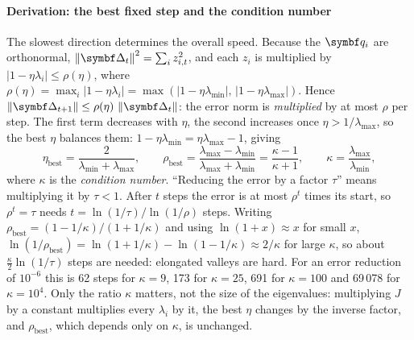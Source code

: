 \documentclass[11pt]{article}
\newcommand{\errv}{\vect{\Delta}}
\newcommand{\qvec}{\vect{q}}
\begin{document}
\paragraph{Derivation: the best fixed step and the condition number} The slowest direction determines the overall
speed. Because the $\qvec_i$ are orthonormal, $\norm{\errv_t}^2 = \sum_i z_{i,t}^2$, and each $z_i$ is multiplied by
$|1 - \eta\lambda_i| \le \rho(\eta)$, where
$\rho(\eta) = \max_i |1 - \eta\lambda_i| = \max(|1 - \eta\lambda_{\min}|,\, |1 - \eta\lambda_{\max}|)$. Hence
$\norm{\errv_{t+1}} \le \rho(\eta)\,\norm{\errv_t}$: the error norm is \emph{multiplied} by at most $\rho$ per step. The
first term decreases with $\eta$, the second increases once
$\eta > 1/\lambda_{\max}$, so the best $\eta$ balances them: $1 - \eta\lambda_{\min} = \eta\lambda_{\max} - 1$, giving
\[
  \eta_{\text{best}} = \frac{2}{\lambda_{\min} + \lambda_{\max}}, \qquad
  \rho_{\text{best}} = \frac{\lambda_{\max} - \lambda_{\min}}{\lambda_{\max} + \lambda_{\min}} = \frac{\kappa - 1}{\kappa + 1},
  \qquad \kappa = \frac{\lambda_{\max}}{\lambda_{\min}} ,
\]
where $\kappa$ is the \emph{condition number}. ``Reducing the error by a factor $\tau$'' means multiplying it by
$\tau < 1$. After $t$ steps the error is at most $\rho^t$ times its start, so $\rho^t = \tau$ needs
$t = \ln(1/\tau)/\ln(1/\rho)$ steps. Writing $\rho_{\text{best}} = (1 - 1/\kappa)/(1 + 1/\kappa)$ and using
$\ln(1 + x) \approx x$ for small $x$, $\ln(1/\rho_{\text{best}}) = \ln(1 + 1/\kappa) - \ln(1 - 1/\kappa) \approx 2/\kappa$
for large $\kappa$, so about $\frac{\kappa}{2}\ln(1/\tau)$ steps are needed: elongated valleys are hard. For an error reduction of $10^{-6}$ this is 62 steps for $\kappa = 9$, 173 for $\kappa = 25$, 691 for
$\kappa = 100$ and 69\,078 for $\kappa = 10^4$. Only the ratio $\kappa$ matters, not the size of the eigenvalues:
multiplying $J$ by a constant multiplies every $\lambda_i$ by it, the best $\eta$ changes by the inverse factor, and
$\rho_{\text{best}}$, which depends only on $\kappa$, is unchanged.
\end{document}
